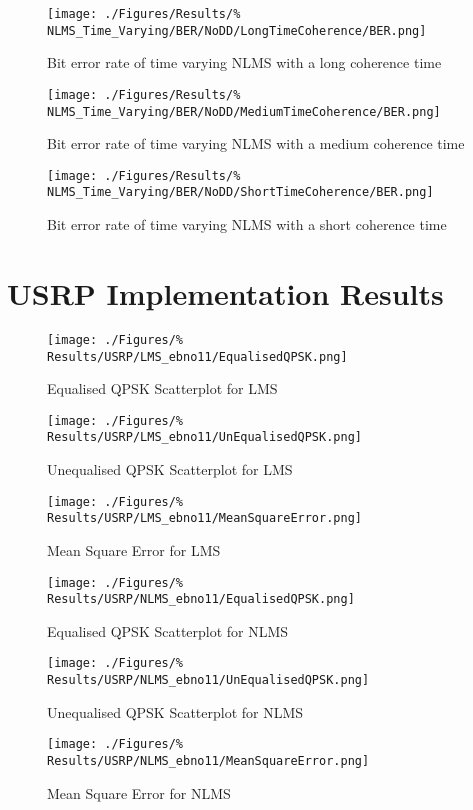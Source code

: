 \begin{figure}[ht]
	\texttt{[image: ./Figures/Results/\%
NLMS\_Time\_Varying/BER/NoDD/LongTimeCoherence/BER.png]}
	\caption{Bit error rate of time varying NLMS with a long coherence time}
\end{figure}
\begin{figure}[ht]
	\texttt{[image: ./Figures/Results/\%
NLMS\_Time\_Varying/BER/NoDD/MediumTimeCoherence/BER.png]}
	\caption{Bit error rate of time varying NLMS with a medium coherence time}
\end{figure}
\begin{figure}[ht]
	\texttt{[image: ./Figures/Results/\%
NLMS\_Time\_Varying/BER/NoDD/ShortTimeCoherence/BER.png]}
	\caption{Bit error rate of time varying NLMS with a short coherence time}
\end{figure}

\section{USRP Implementation Results}
\label{sec:USRPResults}
\FloatBarrier
\begin{figure}[ht]
	\texttt{[image: ./Figures/\%
	Results/USRP/LMS\_ebno11/EqualisedQPSK.png]}
	\caption{Equalised QPSK Scatterplot for LMS}
\end{figure}
\begin{figure}[ht]
	\texttt{[image: ./Figures/\%
	Results/USRP/LMS\_ebno11/UnEqualisedQPSK.png]}
	\caption{Unequalised QPSK Scatterplot for LMS}
\end{figure}
\begin{figure}[ht]
	\texttt{[image: ./Figures/\%
	Results/USRP/LMS\_ebno11/MeanSquareError.png]}
	\caption{Mean Square Error for LMS}
\end{figure}

\begin{figure}[ht]
	\texttt{[image: ./Figures/\%
	Results/USRP/NLMS\_ebno11/EqualisedQPSK.png]}
	\caption{Equalised QPSK Scatterplot for NLMS}
\end{figure}
\begin{figure}[ht]
	\texttt{[image: ./Figures/\%
	Results/USRP/NLMS\_ebno11/UnEqualisedQPSK.png]}
	\caption{Unequalised QPSK Scatterplot for NLMS}
\end{figure}
\begin{figure}[ht]
	\texttt{[image: ./Figures/\%
	Results/USRP/NLMS\_ebno11/MeanSquareError.png]}
	\caption{Mean Square Error for NLMS}
\end{figure}

